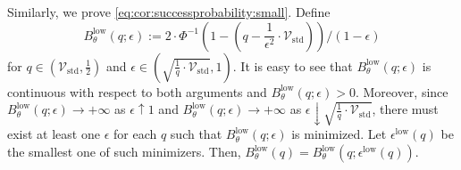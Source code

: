 \documentclass[journal]{IEEEtran}
\renewcommand{\geq}{\geqslant} %
\renewcommand{\leq}{\leqslant} %
\DeclarePairedDelimiter{\abs}{\lvert}{\rvert}
\theoremstyle{definition}
\begin{document}

Similarly, we prove \eqref{eq:cor:successprobability:small}.
Define
\begin{equation}
B_\theta^\mathrm{low}(q; \epsilon)
:= 
2 \cdot\Phi^{-1} \left(1 - \left(q - \frac{1}{\epsilon^2} \cdot \mathcal{V}_\mathrm{std}\right) \right)/ (1 - \epsilon)\label{eq:b_low_q_e}
\end{equation}
for $q\in\left( \mathcal{V}_\mathrm{std} , \frac{1}{2}\right)$ and $\epsilon\in \left(\sqrt{\frac{1}{q}\cdot\mathcal{V}_\mathrm{std}}, 1\right)$.
It is easy to see that $B_\theta^\mathrm{low}(q; \epsilon)$ is continuous with respect to both arguments and $B_\theta^\mathrm{low}(q; \epsilon) > 0$.
Moreover, since $B_\theta^\mathrm{low}(q; \epsilon) \to +\infty$ as $\epsilon \uparrow 1$ and $B_\theta^\mathrm{low}(q; \epsilon) \to +\infty$ as $\epsilon \downarrow \sqrt{\frac{1}{q}\cdot\mathcal{V}_\mathrm{std}}$, there must exist at least one $\epsilon$ for each $q$ such that $B_\theta^\mathrm{low}(q; \epsilon)$ is minimized. Let $\epsilon^\text{low}(q)$ be the smallest one of such minimizers. Then, $B_\theta^\text{low}(q) = B_\theta^\text{low}(q; \epsilon^\text{low}(q))$.
\end{document}
